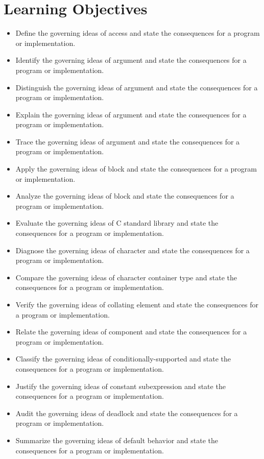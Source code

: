 \documentclass[11pt,letterpaper]{article}
\begin{document}
\section{Learning Objectives}
\begin{itemize}[label=\textcolor{CornellReferenceTeal}{$\blacktriangleright$}]
\item Define the governing ideas of access and state the consequences for a program or implementation.
\item Identify the governing ideas of argument and state the consequences for a program or implementation.
\item Distinguish the governing ideas of argument and state the consequences for a program or implementation.
\item Explain the governing ideas of argument and state the consequences for a program or implementation.
\item Trace the governing ideas of argument and state the consequences for a program or implementation.
\item Apply the governing ideas of block and state the consequences for a program or implementation.
\item Analyze the governing ideas of block and state the consequences for a program or implementation.
\item Evaluate the governing ideas of C standard library and state the consequences for a program or implementation.
\item Diagnose the governing ideas of character and state the consequences for a program or implementation.
\item Compare the governing ideas of character container type and state the consequences for a program or implementation.
\item Verify the governing ideas of collating element and state the consequences for a program or implementation.
\item Relate the governing ideas of component and state the consequences for a program or implementation.
\item Classify the governing ideas of conditionally-supported and state the consequences for a program or implementation.
\item Justify the governing ideas of constant subexpression and state the consequences for a program or implementation.
\item Audit the governing ideas of deadlock and state the consequences for a program or implementation.
\item Summarize the governing ideas of default behavior and state the consequences for a program or implementation.
\end{itemize}
\end{document}
